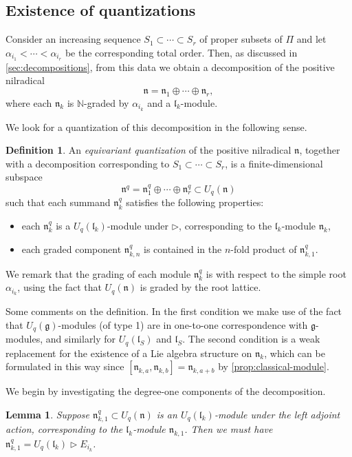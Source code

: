 \documentclass[a4paper, 12pt, reqno, english]{amsart}
\numberwithin{equation}{section}
\numberwithin{figure}{section}
\theoremstyle{plain}
\theoremstyle{plain}
\theoremstyle{plain}
\theoremstyle{plain}
\newtheorem{lemma}[theorem]{Lemma}
\theoremstyle{plain}
\theoremstyle{definition}
\newtheorem{definition}[theorem]{Definition}
\theoremstyle{definition}
\theoremstyle{definition}
\theoremstyle{remark}
\theoremstyle{definition}
\theoremstyle{definition}
\newcommand{\Uqg}{U_q(\mathfrak{g})}
\newcommand{\Uqn}{U_q(\mathfrak{n})}
\newcommand{\UqlS}{U_q(\mathfrak{l}_S)}
\newcommand{\Uqlk}{U_q(\mathfrak{l}_k)}
\newcommand{\bbN}{\mathbb{N}}
\newcommand{\lieg}{\mathfrak{g}}
\newcommand{\liel}{\mathfrak{l}}
\newcommand{\lien}{\mathfrak{n}}
\newcommand{\simpleroots}{\Pi}
\newcommand{\qnil}{\lien^q}
\begin{document}
\subsection{Existence of quantizations}

Consider an increasing sequence $S_1 \subset \cdots \subset S_r$ of proper subsets of $\simpleroots$ and let $\alpha_{i_1} < \cdots < \alpha_{i_r}$ be the corresponding total order.
Then, as discussed in \cref{sec:decompositions}, from this data we obtain a decomposition of the positive nilradical
\[
\lien = \lien_1 \oplus \cdots \oplus \lien_r,
\]
where each $\lien_k$ is $\bbN$-graded by $\alpha_{i_k}$ and a $\liel_k$-module.

We look for a quantization of this decomposition in the following sense.

\begin{definition}
\label{def:equivariant-quantization}
An \emph{equivariant quantization} of the positive nilradical $\lien$, together with a decomposition corresponding to $S_1 \subset \cdots \subset S_r$, is a finite-dimensional subspace
\[
\qnil = \qnil_1 \oplus \cdots \oplus \qnil_r \subset \Uqn
\]
such that each summand $\qnil_k$ satisfies the following properties:
\begin{itemize}
\item each $\qnil_k$ is a $\Uqlk$-module under $\triangleright$, corresponding to the $\liel_k$-module $\lien_k$,
\item each graded component $\qnil_{k, n}$ is contained in the $n$-fold product of $\qnil_{k, 1}$.
\end{itemize}
\end{definition}

We remark that the grading of each module $\qnil_k$ is with respect to the simple root $\alpha_{i_k}$, using the fact that $\Uqn$ is graded by the root lattice.

Some comments on the definition.
In the first condition we make use of the fact that $\Uqg$-modules (of type 1) are in one-to-one correspondence with $\lieg$-modules, and similarly for $\UqlS$ and $\liel_S$.
The second condition is a weak replacement for the existence of a Lie algebra structure on $\lien_k$, which can be formulated in this way since $[\lien_{k, a}, \lien_{k, b}] = \lien_{k, a + b}$ by \cref{prop:classical-module}.

We begin by investigating the degree-one components of the decomposition.

\begin{lemma}
\label{lem:action-degree-one}
Suppose $\qnil_{k, 1} \subset \Uqn$ is an $\Uqlk$-module under the left adjoint action, corresponding to the $\liel_k$-module $\lien_{k, 1}$.
Then we must have $\qnil_{k, 1} = \Uqlk \triangleright E_{i_k}$.
\end{lemma}
\end{document}
